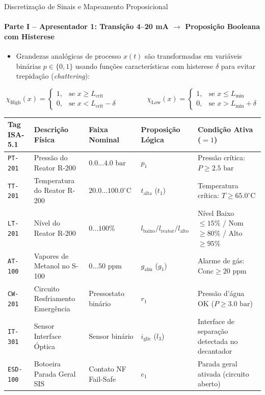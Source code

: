 \documentclass[aspectratio=169, 10pt]{beamer}
\begin{document}
\begin{frame}{Discretização de Sinais e Mapeamento Proposicional}
  \framesubtitle{Parte I -- Apresentador 1: Transição 4--20 mA $\to$ Proposição Booleana com Histerese}
  \begin{itemize}
    \item Grandezas analógicas de processo $x(t)$ são transformadas em variáveis binárias $p \in \{0, 1\}$ usando funções características com histerese $\delta$ para evitar trepidação (\textit{chattering}):
  \end{itemize}
  $$\chi_{\text{High}}(x) = \begin{cases} 1, & \text{se } x \ge L_{\text{crit}} \\ 0, & \text{se } x < L_{\text{crit}} - \delta \end{cases} \qquad\qquad \chi_{\text{Low}}(x) = \begin{cases} 1, & \text{se } x \le L_{\text{min}} \\ 0, & \text{se } x > L_{\text{min}} + \delta \end{cases}$$

  \begin{table}[h]
    \centering
    \tiny
    \begin{tabular}{lllll}
      \toprule
      \textbf{Tag ISA-5.1} & \textbf{Descrição Física} & \textbf{Faixa Nominal} & \textbf{Proposição Lógica} & \textbf{Condição Ativa ($=1$)} \\
      \midrule
      \texttt{PT-201} & Pressão do Reator R-200 & $0.0 \dots 4.0\text{ bar}$ & $p_1$ & Pressão crítica: $P \ge 2.5\text{ bar}$ \\
      \texttt{TT-201} & Temperatura do Reator R-200 & $20.0 \dots 100.0^\circ\text{C}$ & $t_{\text{alta}}$ ($t_1$) & Temperatura crítica: $T \ge 65.0^\circ\text{C}$ \\
      \texttt{LT-201} & Nível do Reator R-200 & $0 \dots 100\%$ & $l_{\text{baixo}} / l_{\text{reator}} / l_{\text{alto}}$ & Nível Baixo $\le 15\%$ / Nom $\ge 80\%$ / Alto $\ge 95\%$ \\
      \texttt{AT-100} & Vapores de Metanol no S-100 & $0 \dots 50\text{ ppm}$ & $g_{\text{alm}}$ ($g_1$) & Alarme de gás: $\text{Conc} \ge 20\text{ ppm}$ \\
      \texttt{CW-201} & Circuito Resfriamento Emergência & Pressostato binário & $r_1$ & Pressão d'água OK ($P \ge 3.0\text{ bar}$) \\
      \texttt{IT-301} & Sensor Interface Óptica & Sensor binário & $i_{\text{glic}}$ ($l_3$) & Interface de separação detectada no decantador \\
      \texttt{ESD-100} & Botoeira Parada Geral SIS & Contato NF Fail-Safe & $e_1$ & Parada geral ativada (circuito aberto) \\
      \bottomrule
    \end{tabular}
  \end{table}
\end{frame}
\end{document}
